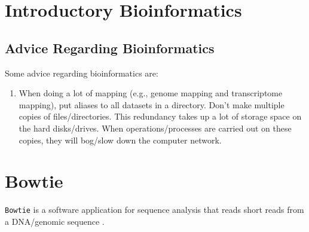 \section{Introductory Bioinformatics}
\label{sec:IntroductoryBioinformatics}





\subsection{Advice Regarding Bioinformatics}
\label{ssec:BioinformaticsAdvice}

Some advice regarding bioinformatics are: \vspace{-0.3cm}
\begin{enumerate} \itemsep -4pt
\item When doing a lot of mapping (e.g., genome mapping and transcriptome mapping), put aliases to all datasets in a directory. Don't make multiple copies of files/directories. This redundancy takes up a lot of storage space on the hard disks/drives. When operations/processes are carried out on these copies, they will bog/slow down the computer network. 
\end{enumerate}




\section{Bowtie}
\label{sec:Bowtie}

{\tt Bowtie} is a software application for sequence analysis that reads short reads from a DNA/genomic sequence \cite{Langmead2014}.


